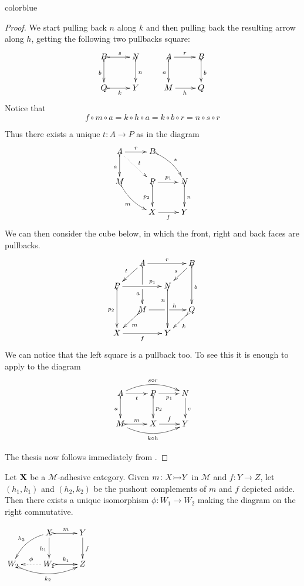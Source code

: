 \documentclass[a4paper,UKenglish,cleveref,pdftex,thm-restate,numberwithinsect,anonymous]{lipics}
\newcommand{\full}[1]{{color{blue}#1}}
\newcommand{\full}[1]{}
\newcommand{\mto}[0]{\scalebox{1}{$\rightarrowtail$}}
\def\X{\textbf {\textup{X}}}
\begin{document}
\full{ 
\begin{proof}
	We start pulling back $n$ along $k$ and then pulling back the resulting arrow along $h$, getting the following two pullbacks square:
	\[\xymatrix{B \ar@{>->}[d]_{b}\ar@{>->}[r]^{s}& N \ar@{>->}[d]^{n} & A \ar[r]^{r} \ar@{>->}[d]_{a}& B \ar@{>->}[d]^{b}\\Q\ar@{>->}[r]_{k}&Y &M \ar[r]_h&Q\\}\]
	Notice that
	\[
		f\circ m\circ a=k\circ h\circ a=k\circ b\circ r=n\circ s\circ r\]

	Thus there exists a unique $t\colon A\to P$ as in the diagram
	\[\xymatrix{A \ar@{>->}[d]_{a} \ar@{.>}[dr]^{t}\ar[r]^{r} &B \ar@{>->}@/^.2cm/[dr]^{s} \\ M \ar@{>->}@/_.2cm/[dr]_{m}&P\ar[r]^{p_1}  \ar@{>->}[d]_{p_2}& N \ar@{>->}[d]^{n}\\ &X \ar[r]_{f} & Y}\]
	We can then consider the cube below, in which the front, right and back faces are pullbacks.
	\[\xymatrix@C=15pt@R=15pt{&A\ar@{>->}[dd]|\hole_(.65){a}\ar[rr]^{r} \ar[dl]_{t} && B \ar@{>->}[dd]^{b} \ar[dl]_{s} \\ P  \ar@{>->}[dd]_{p_2}\ar[rr]^(.7){p_1} & & N \ar@{>->}[dd]_(.3){n}\\&M\ar[rr]|\hole^(.65){h} \ar@{>->}[dl]^{m} && Q \ar@{>->}[dl]^{k} \\X \ar[rr]_{f} & & Y}\]
	We can notice that the left square is a pullback too. To see this it is enough to apply \Cref{lem:pb1} to the diagram
	\[\xymatrix{A  \ar@/^.4cm/[rr]^{s\circ r}\ar@{>->}[d]_{a} \ar[r]_{t}& \ar[r]_{p_1} P \ar@{>->}[d]^{p_2}& N \ar[d]^{c}\\ M \ar@/_.4cm/[rr]_{k\circ h}\ar@{>->}[r]^{m}& X \ar[r]^{f}& Y}\]

	The thesis now follows immediately from \Cref{lem:varie}. \qedhere
\end{proof}
}
\noindent
\parbox{10cm}{
	\begin{corollary}\label{lem:pocomp}
		Let $\X$ be a $\mathcal{M}$-adhesive category. Given $m\colon X\mto Y$ in $\mathcal{M}$ and $f\colon Y\to Z$, let $(h_1, k_1)$ and $(h_2, k_2)$ be the pushout complements of $m$  and $f$ depicted aside. Then there exists a unique isomorphism $\phi\colon W_1\to W_2$ making the diagram on the right commutative.
	\end{corollary}}
\parbox{3cm}{\vspace{1em}$\xymatrix{&X \ar@{>->}[r]^{m} \ar[d]_{h_1} \ar@/_.3cm/[dl]_{h_2}& Y \ar[d]^{f} \\ W_2 \ar@{>->}@/_.4cm/[rr]_{k_2} &W_1 \ar@{.>}[l]_{\phi} \ar@{>->}[r]^{k_1} & Z }$}
\end{document}
